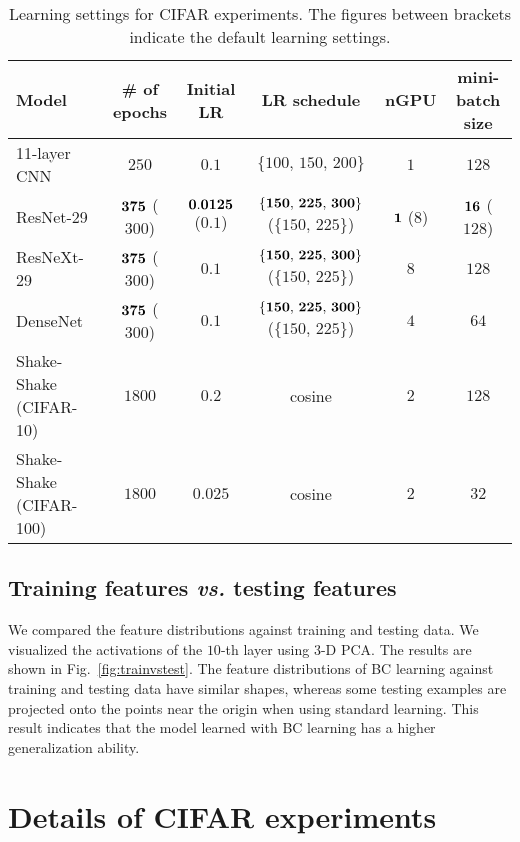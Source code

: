 \documentclass[10pt,twocolumn,letterpaper]{article}
\begin{document}
\begin{table*}
	\centering
	\caption{Learning settings for CIFAR experiments. The figures between brackets indicate the default learning settings.}
	\label{tab:settings}
	\vspace{2mm}
	\small
	\begin{tabular}{lccccc}
		\toprule
		Model & \# of epochs & Initial LR & LR schedule & nGPU & mini-batch size \\
		\midrule
		11-layer CNN & $250$ & $0.1$ & $\{ 100,\, 150,\, 200\}$ & $1$ & $128$ \\
		ResNet-29 \cite{xie2017aggregated} & ${\bf 375}$ ($300$) & ${\bf 0.0125}$ ($0.1$) & ${\bf{\{ 150,\, 225,\, 300\}}}$ ($\{ 150,\, 225\}$) & ${\bf 1}$ ($8$) & ${\bf 16}$ ($128$) \\
		ResNeXt-29 \cite{xie2017aggregated} & ${\bf 375}$ ($300$) & $0.1$ & ${\bf \{ 150,\, 225,\, 300\}}$ ($\{ 150,\, 225\}$) & $8$ & $128$ \\
		DenseNet \cite{huang2017densely} & ${\bf 375}$ ($300$) & $0.1$ & ${\bf \{ 150,\, 225,\, 300\}}$ ($\{ 150,\, 225\}$) & $4$ & $64$ \\
		Shake-Shake \cite{gastaldi2017shake} (CIFAR-10) & $1800$ & $0.2$ & cosine & $2$ & $128$ \\
		Shake-Shake \cite{gastaldi2017shake} (CIFAR-100) & $1800$ & $0.025$ & cosine & $2$ & $32$ \\
		\bottomrule
	\end{tabular}
\end{table*}

\subsection{Training features {\it vs.} testing features}

We compared the feature distributions against training and testing data. We visualized the activations of the $10$-th layer using $3$-D PCA. The results are shown in Fig.~\ref{fig:trainvstest}. The feature distributions of BC learning against training and testing data have similar shapes, whereas some testing examples are projected onto the points near the origin when using standard learning. This result indicates that the model learned with BC learning has a higher generalization ability.


\section{Details of CIFAR experiments}
\end{document}
